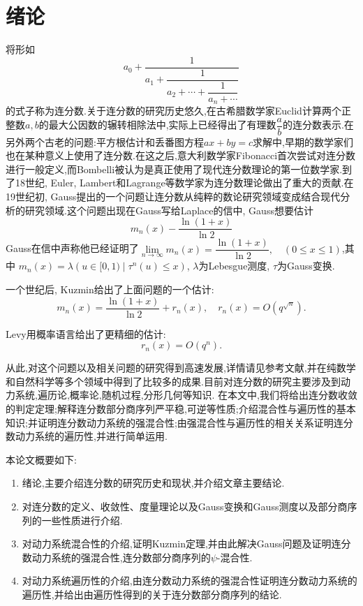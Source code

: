 \seccontent
\section{绪论}
\hspace{12em}

将形如
\begin{equation}\label{definition}
      a_0+\frac{1}{a_1+\dfrac{1}{a_2+\cdots+\dfrac{1}{a_n+\cdots}}}
\end{equation}
的式子称为连分数.关于连分数的研究历史悠久,在古希腊数学家Euclid计算两个正整数$a,b$的最大公因数的辗转相除法中,实际上已经得出了有理数$\dfrac{a}{b}$的连分数表示.在另外两个古老的问题:平方根估计和丢番图方程$ax+by=c$求解中,早期的数学家们也在某种意义上使用了连分数.在这之后,意大利数学家Fibonacci首次尝试对连分数进行一般定义,而Bombelli被认为是真正使用了现代连分数理论的第一位数学家.到了18世纪, Euler, Lambert和Lagrange等数学家为连分数理论做出了重大的贡献.在19世纪初, Gauss提出的一个问题让连分数从纯粹的数论研究领域变成结合现代分析的研究领域.这个问题出现在Gauss写给Laplace的信中, Gauss想要估计
$$m_n(x)-\frac{\ln(1+x)}{\ln{2}}$$
Gauss在信中声称他已经证明了$\lim\limits_{n\to\infty}m_n(x)=\dfrac{\ln(1+x)}{\ln{2}},\quad(0\leqslant x\leqslant 1)$,其中
$m_n(x)=\lambda({u\in[0,1)\mid\tau^n(u)\leqslant x})$, $\lambda$为Lebesgue测度, $\tau$为Gauss变换.\par
一个世纪后, Kuzmin给出了上面问题的一个估计\textsuperscript{\cite{Kuzmin}}:
$$m_n\left(x\right)=\frac{\ln{\left(1+x\right)}}{\ln{2}}+r_n\left(x\right),\quad r_n\left(x\right)=O\left(q^{\sqrt n}\right).$$\par
Levy用概率语言给出了更精细的估计\textsuperscript{\cite{Iosifescu,Levy}}:
$$r_n(x)=O(q^n).$$\par
从此,对这个问题以及相关问题的研究得到高速发展,详情请见参考文献\cite{Liu_Peng,The_long_history,Iosifescu,Gauss-Kuzmin_type,Zhang_Xian,Random_variables,Dimensional_theory,Zhang_Mengjie,Xie_Shenghan,Geng_Xianjin},并在纯数学和自然科学等多个领域中得到了比较多的成果.目前对连分数的研究主要涉及到动力系统,遍历论,概率论,随机过程,分形几何等知识.
在本文中,我们将给出连分数收敛的判定定理;解释连分数部分商序列严平稳,可逆等性质;介绍混合性与遍历性的基本知识;并证明连分数动力系统的强混合性;由强混合性与遍历性的相关关系证明连分数动力系统的遍历性,并进行简单运用.\par
本论文概要如下:
\begin{enumerate}
      \item 绪论,主要介绍连分数的研究历史和现状,并介绍文章主要结论.
      \item 对连分数的定义、收敛性、度量理论以及Gauss变换和Gauss测度以及部分商序列的一些性质进行介绍.
      \item 对动力系统混合性的介绍,证明Kuzmin定理,并由此解决Gauss问题及证明连分数动力系统的强混合性,连分数部分商序列的$\psi$-混合性.
      \item 对动力系统遍历性的介绍,由连分数动力系统的强混合性证明连分数动力系统的遍历性,并给出由遍历性得到的关于连分数部分商序列的结论.
\end{enumerate}

\sectionbreak